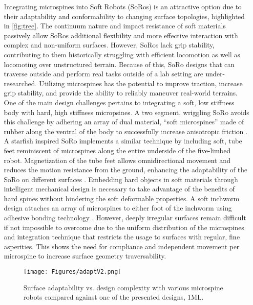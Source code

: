 Integrating microspines into Soft Robots (SoRos) is an attractive option due to their adaptability and conformability to changing surface topologies, highlighted in \Fig \ref{fig:tree}. %
The continuum nature and impact resistance of soft materials passively allow SoRos additional flexibility and more effective interaction with complex and non-uniform surfaces. %
However, SoRos lack grip stability, contributing to them historically struggling with efficient locomotion as well as locomoting over unstructured terrain. Because of this, SoRo designs that can traverse outside and perform real tasks outside of a lab setting are under-researched. Utilizing microspines has the potential to improve traction, increase grip stability, and provide the ability to reliably maneuver real-world terrains. One of the main design challenges pertains to integrating a soft, low stiffness body with hard, high stiffness micropsines. A two segment, wriggling SoRo avoids this challenge by adhering an array of dual material, ``soft microspines'' made of rubber along the ventral of the body to successfully increase anisotropic friction \cite{ta_design_2018}. A starfish inspired SoRo implements a similar technique by including soft, tube feet reminiscent of microspines along the entire underside of the five-limbed robot. Magnetization of the tube feet allows omnidirectional movement and reduces the motion resistance from the ground, enhancing the adaptability of the SoRo on different surfaces \cite{yang_starfish_2021}. Embedding hard objects in soft materials through intelligent mechanical design is necessary to take advantage of the benefits of hard spines without hindering the soft deformable properties. A soft inchworm design attaches an array of microspines to either foot of the inchworm using adhesive bonding technology \cite{hu_inchworm-inspired_2019}. However, deeply irregular surfaces remain difficult if not impossible to overcome due to the uniform distribution of the microspines and integration technique that restricts the usage to surfaces with regular, fine asperities. This shows the need for compliance and independent movement per microspine to increase surface geometry traversability.


\begin{figure}[h]
    \centering
    \texttt{[image: Figures/adaptV2.png]}
    \caption{Surface adaptability vs. design complexity with various microspine robots \cite{asbeck_scaling_2006, wang_palm_2016, parness_lemur_2017, liu_novel_2019, hu_inchworm-inspired_2019,Daltorio_Wei_Horchler_Southard_Wile_Quinn_Gorb_Ritzmann_2009, Spenko_Haynes_Saunders_Cutkosky_Rizzi_Full_Koditschek_2008} compared against one of the presented designs, 1ML.}
    \label{fig:adapt}
\end{figure}


